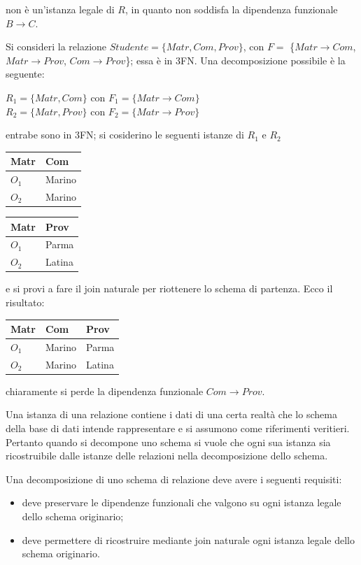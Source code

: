     non è un'istanza legale di $R$, in quanto non soddisfa la dipendenza funzionale
    $B\rightarrow C$.
 \label{esempio_4_2}
 \begin{exmp}
  Si consideri la relazione $Studente = \{Matr, Com, Prov\}$, con $F = $ \{$Matr\rightarrow Com$,
  $Matr\rightarrow Prov$, $Com\rightarrow Prov$\}; essa è in 3FN. Una decomposizione possibile è
  la seguente:
  \begin{center}
    $R_1 = \{Matr, Com\}$ con $F_1 = \{Matr\rightarrow Com\}$ \\
    $R_2 = \{Matr, Prov\}$ con $F_2 = \{Matr\rightarrow Prov\}$ \\
   \end{center}
  entrabe sono in 3FN; si cosiderino le seguenti istanze di $R_1$ e $R_2$
  \begin{multicols}{2}
  \begin{flushright} 
  \begin{tabular}{l | l }
  Matr & Com\\
  \hline
  $O_1$ & Marino\\
  $O_2$ & Marino
 \end{tabular}
 \end{flushright}
  
  \begin{flushleft}
   \begin{tabular}{ l | l}
  Matr & Prov \\
  \hline
  $O_1$ & Parma\\
  $O_2$ & Latina
 \end{tabular}
\end{flushleft}
\end{multicols}
e si provi a fare il join naturale per riottenere lo schema di partenza. Ecco il
risultato:
  \begin{center} 
  \begin{tabular}{l | l | l}
  Matr & Com & Prov\\
  \hline
  $O_1$ & Marino & Parma\\
  $O_2$ & Marino & Latina
 \end{tabular}
 \end{center}
 
 chiaramente si perde la dipendenza funzionale $Com\rightarrow Prov$.
\end{exmp}
Una istanza di una relazione contiene i dati di una certa realtà che lo schema della 
base di dati intende rappresentare e si assumono come riferimenti veritieri. Pertanto 
quando si decompone uno schema si vuole che ogni sua istanza sia ricostruibile dalle istanze
delle relazioni nella decomposizione dello schema.
\begin{prop}
Una decomposizione di uno schema di relazione deve avere i seguenti requisiti:
\begin{itemize}
 \item deve preservare le dipendenze funzionali che valgono su ogni istanza legale dello 
 schema originario;
 \item deve permettere di ricostruire mediante join naturale ogni istanza legale 
 dello schema originario.
\end{itemize} 
\end{prop}

